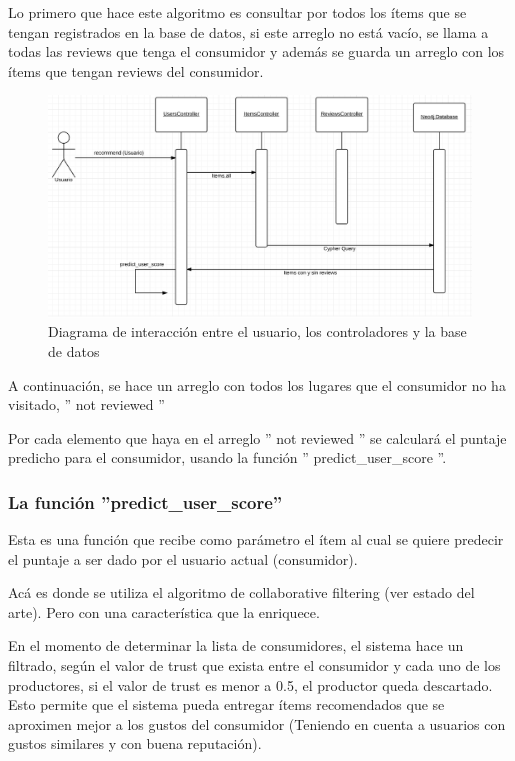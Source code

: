Lo primero que hace este algoritmo es consultar por todos los ítems que se tengan registrados en la base de datos, si este arreglo no está vacío, se llama a todas las reviews que tenga el consumidor y además se guarda un arreglo con los ítems que tengan reviews del consumidor. 

\begin{figure}[hbtp]
\centering
\includegraphics[scale=0.8]{images/recc_funct.png}
\caption{Diagrama de interacción entre el usuario, los controladores y la base de datos}
\end{figure}

A continuación, se hace un arreglo con todos los lugares que el consumidor no ha visitado,  '' not reviewed ''

Por cada elemento que haya en el arreglo '' not reviewed '' se calculará el puntaje predicho para el consumidor, usando la función '' predict\_user\_score ''.

\subsubsection{La función ''predict\_user\_score''}

Esta es una función que recibe como parámetro el ítem al cual se quiere predecir el puntaje a ser dado por el usuario actual (consumidor).

Acá es donde se utiliza el algoritmo de collaborative filtering (ver estado del arte). Pero con una característica que la enriquece. 

En el momento de determinar la lista de consumidores, el sistema hace un filtrado, según el valor de trust que exista entre el consumidor y cada uno de los productores, si el valor de trust es menor a 0.5, el productor queda descartado. Esto permite que el sistema pueda entregar ítems recomendados que se aproximen mejor a los gustos del consumidor (Teniendo en cuenta a usuarios con gustos similares y con buena reputación). 

   







